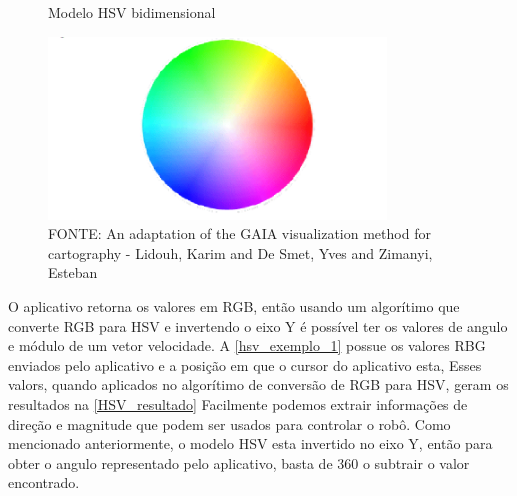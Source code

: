 \begin{figure}[htb]
	\centering
	\caption{Modelo HSV bidimensional \cite{hsv_model}}
	\includegraphics[width=0.8\textwidth]{figures/HSV}
	\caption*{FONTE: An adaptation of the GAIA visualization method for cartography - Lidouh, Karim and De Smet, Yves and Zimanyi, Esteban \cite{hsv_model}}
\end{figure}


O aplicativo retorna os valores em RGB, então usando um algorítimo
que converte RGB para HSV e invertendo o eixo Y
é possível ter os valores de angulo e módulo de um vetor velocidade.
A \autoref{hsv_exemplo_1} possue os valores RBG enviados pelo aplicativo
e a posição em que o cursor do aplicativo esta,
Esses valors, quando aplicados no algorítimo de conversão de RGB para HSV, geram os resultados na \autoref{HSV_resultado}
Facilmente podemos extrair informações de direção e magnitude que podem ser usados para controlar o robô.
Como mencionado anteriormente, o modelo HSV esta invertido no eixo Y,
então para obter o angulo representado pelo aplicativo, basta de 360 o subtrair o valor encontrado.

